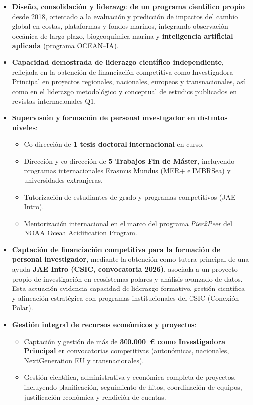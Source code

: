 \documentclass[11pt,a4paper]{article}
\begin{document}
\begin{itemize}[leftmargin=*]

    \item \textbf{Diseño, consolidación y liderazgo de un programa científico propio} desde 2018, orientado a la evaluación y predicción de impactos del cambio global en costas, plataformas y fondos marinos, integrando observación oceánica de largo plazo, biogeoquímica marina y \textbf{inteligencia artificial aplicada} (programa OCEAN--IA).

    \item \textbf{Capacidad demostrada de liderazgo científico independiente}, reflejada en la obtención de financiación competitiva como Investigadora Principal en proyectos regionales, nacionales, europeos y transnacionales, así como en el liderazgo metodológico y conceptual de estudios publicados en revistas internacionales Q1.

    \item \textbf{Supervisión y formación de personal investigador en distintos niveles}:
    \begin{itemize}
        \item Co-dirección de \textbf{1 tesis doctoral internacional} en curso.
        \item Dirección y co-dirección de \textbf{5 Trabajos Fin de Máster}, incluyendo programas internacionales Erasmus Mundus (MER+ e IMBRSea) y universidades extranjeras.
        \item Tutorización de estudiantes de grado y programas competitivos (JAE-Intro).
        \item Mentorización internacional en el marco del programa \textit{Pier2Peer} del NOAA Ocean Acidification Program.
    \end{itemize}
\item \textbf{Captación de financiación competitiva para la formación de personal investigador}, mediante la obtención como tutora principal de una ayuda \textbf{JAE Intro (CSIC, convocatoria 2026)}, asociada a un proyecto propio de investigación en ecosistemas polares y análisis avanzado de datos.\\
Esta actuación evidencia capacidad de liderazgo formativo, gestión científica y alineación estratégica con programas institucionales del CSIC (Conexión Polar).
    \item \textbf{Gestión integral de recursos económicos y proyectos}:
    \begin{itemize}
        \item Captación y gestión de más de \textbf{300.000~€ como Investigadora Principal} en convocatorias competitivas (autonómicas, nacionales, NextGeneration EU y transnacionales).
        \item Gestión científica, administrativa y económica completa de proyectos, incluyendo planificación, seguimiento de hitos, coordinación de equipos, justificación económica y rendición de cuentas.
    \end{itemize}


\end{itemize}
\end{document}
